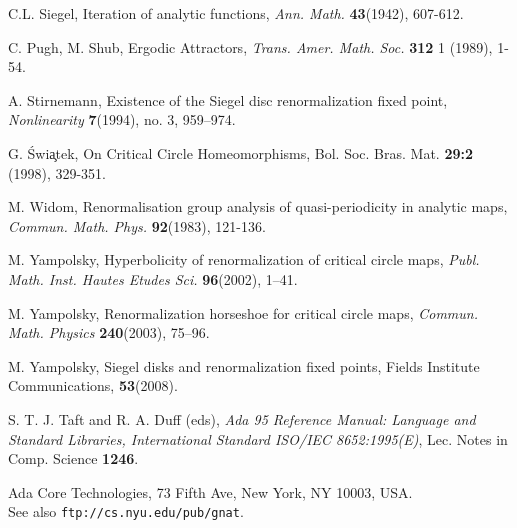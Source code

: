 \begin{thebibliography}{}


 C.L. Siegel, Iteration of analytic functions, {\it Ann. Math.} {\bf 43}(1942), 607-612.

 C. Pugh, M. Shub, Ergodic Attractors, {\it Trans. Amer. Math. Soc.} {\bf 312} 1 (1989), 1-54.

 A. Stirnemann,  Existence of the Siegel disc renormalization fixed point,  {\it  Nonlinearity } {\bf 7}(1994),  no. 3, 959--974.


 G. \'Swi\c{a}tek, On Critical Circle Homeomorphisms, Bol. Soc. Bras. Mat. \textbf{29:2} (1998), 329-351.

 M. Widom, Renormalisation group analysis of quasi-periodicity in analytic maps,
{\it Commun. Math. Phys.} {\bf 92}(1983), 121-136.

 M. Yampolsky, Hyperbolicity of renormalization of critical circle maps,
{\it  Publ. Math. Inst. Hautes Etudes Sci.} {\bf 96}(2002), 1--41.

 M. Yampolsky, Renormalization horseshoe for critical circle maps,
{\it  Commun. Math. Physics} {\bf 240}(2003), 75--96.

 M. Yampolsky,  Siegel disks and renormalization fixed points, Fields Institute Communications, {\bf 53}(2008).

   S. T. J. Taft and R. A. Duff (eds), {\it Ada 95 Reference Manual: Language and Standard Libraries, International Standard ISO/IEC 8652:1995(E)},  Lec. Notes in Comp. Science {\bf 1246}. 

   Ada Core Technologies, 73 Fifth Ave, New York, NY 10003, USA.\\ See also {\tt ftp://cs.nyu.edu/pub/gnat}.

\end{thebibliography}
